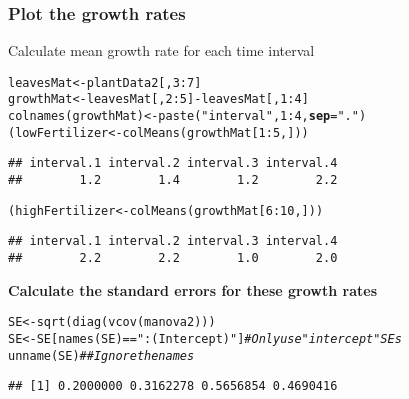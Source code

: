 \documentclass[color=usenames,dvipsnames]{beamer}\usepackage[]{graphicx}\usepackage[]{color}
\makeatletter
\newcommand{\hlnum}[1]{\textcolor[rgb]{0.69,0.494,0}{#1}}%
\newcommand{\hlstr}[1]{\textcolor[rgb]{0.749,0.012,0.012}{#1}}%
\newcommand{\hlcom}[1]{\textcolor[rgb]{0.514,0.506,0.514}{\textit{#1}}}%
\newcommand{\hlopt}[1]{\textcolor[rgb]{0,0,0}{#1}}%
\newcommand{\hlstd}[1]{\textcolor[rgb]{0,0,0}{#1}}%
\newcommand{\hlkwb}[1]{\textcolor[rgb]{0,0.341,0.682}{#1}}%
\newcommand{\hlkwc}[1]{\textcolor[rgb]{0,0,0}{\textbf{#1}}}%
\newcommand{\hlkwd}[1]{\textcolor[rgb]{0.004,0.004,0.506}{#1}}%
\newenvironment{kframe}{%
 \def\at@end@of@kframe{}%
 \ifinner\ifhmode%
  \def\at@end@of@kframe{\end{minipage}}%
  \begin{minipage}{\columnwidth}%
 \fi\fi%
 \def\FrameCommand##1{\hskip\@totalleftmargin \hskip-\fboxsep
 \colorbox{shadecolor}{##1}\hskip-\fboxsep
     \hskip-\linewidth \hskip-\@totalleftmargin \hskip\columnwidth}%
 \MakeFramed {\advance\hsize-\width
   \@totalleftmargin\z@ \linewidth\hsize
   \@setminipage}}%
 {\par\unskip\endMakeFramed%
 \at@end@of@kframe}
\newenvironment{knitrout}{}{} %
\makeatother
\begin{document}
\begin{frame}[fragile]
  \frametitle{Plot the growth rates}
  \small
  {%
    Calculate mean growth rate for each time interval}%
  \pause
\begin{knitrout}\small
{}\color{fgcolor}\begin{kframe}
\begin{alltt}
\hlstd{leavesMat} \hlkwb{<-} \hlstd{plantData2[,}\hlnum{3}\hlopt{:}\hlnum{7}\hlstd{]}
\hlstd{growthMat} \hlkwb{<-} \hlstd{leavesMat[,}\hlnum{2}\hlopt{:}\hlnum{5}\hlstd{]} \hlopt{-} \hlstd{leavesMat[,}\hlnum{1}\hlopt{:}\hlnum{4}\hlstd{]}
\hlkwd{colnames}\hlstd{(growthMat)} \hlkwb{<-} \hlkwd{paste}\hlstd{(}\hlstr{"interval"}\hlstd{,} \hlnum{1}\hlopt{:}\hlnum{4}\hlstd{,} \hlkwc{sep}\hlstd{=}\hlstr{"."}\hlstd{)}
\hlstd{(lowFertilizer} \hlkwb{<-} \hlkwd{colMeans}\hlstd{(growthMat[}\hlnum{1}\hlopt{:}\hlnum{5}\hlstd{,]))}
\end{alltt}
\begin{verbatim}
## interval.1 interval.2 interval.3 interval.4 
##        1.2        1.4        1.2        2.2
\end{verbatim}
\begin{alltt}
\hlstd{(highFertilizer} \hlkwb{<-} \hlkwd{colMeans}\hlstd{(growthMat[}\hlnum{6}\hlopt{:}\hlnum{10}\hlstd{,]))}
\end{alltt}
\begin{verbatim}
## interval.1 interval.2 interval.3 interval.4 
##        2.2        2.2        1.0        2.0
\end{verbatim}
\end{kframe}
\end{knitrout}
\pause
{\bf Calculate the standard errors for these growth rates}
\footnotesize
\begin{knitrout}\footnotesize
{}\color{fgcolor}\begin{kframe}
\begin{alltt}
\hlstd{SE} \hlkwb{<-} \hlkwd{sqrt}\hlstd{(}\hlkwd{diag}\hlstd{(}\hlkwd{vcov}\hlstd{(manova2)))}
\hlstd{SE} \hlkwb{<-} \hlstd{SE[}\hlkwd{names}\hlstd{(SE)}\hlopt{==}\hlstr{":(Intercept)"}\hlstd{]} \hlcom{# Only use "intercept" SEs}
\hlkwd{unname}\hlstd{(SE)} \hlcom{## Ignore the names}
\end{alltt}
\begin{verbatim}
## [1] 0.2000000 0.3162278 0.5656854 0.4690416
\end{verbatim}
\end{kframe}
\end{knitrout}
\end{frame}
\end{document}
